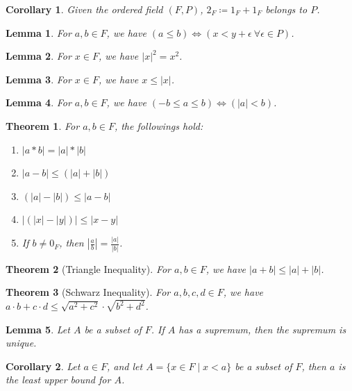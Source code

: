 \documentclass[11pt]{article}
\theoremstyle{break}
\theoremstyle{break}
\newtheorem{thm}{Theorem}[section]
\newtheorem{lem}{Lemma}[thm]
\newtheorem{corL}{Corollary}[lem]
\begin{document}
	\begin{corL}
		Given the ordered field $(F,P)$, $2_F \coloneqq 1_F + 1_F$ belongs to $P$.
	\end{corL}

	\begin{lem}
		For $a,b \in F$, we have $(a \leq b) \iff (x<y+\epsilon \ \forall \epsilon \in P)$.
	\end{lem}

	\begin{lem}
		For $x \in F$, we have $|x|^2 = x^2$.
	\end{lem}

	\begin{lem}
		For $x \in F$, we have $x \leq |x|$.
	\end{lem}
	
	\begin{lem}
		For $a,b \in F$, we have $(-b \leq a \leq b) \iff (|a| <b)$.
	\end{lem}

	\begin{thm}
		For $a,b \in F$, the followings hold:
		\begin{enumerate}[topsep=3pt,itemsep=-1ex,partopsep=1ex,parsep=1ex]
			\item $|a \ast b|=|a| \ast |b|$
			\item $|a-b| \leq (|a| + |b|)$
			\item $(|a|-|b|) \leq |a-b|$
			\item $|(|x|-|y|)| \leq |x-y|$
			\item If $b \neq 0_F$, then $\left|\frac{a}{b} \right|=\frac{|a|}{|b|}$.
		\end{enumerate}		 
	\end{thm}

	\begin{thm}[Triangle Inequality]
		For $a,b \in F$, we have $|a + b| \leq |a| + |b|$.	
	\end{thm}
	
	\begin{thm}[Schwarz Inequality]
		For $a,b,c,d \in F$, we have $a \cdot b + c \cdot d \leq \sqrt{a^2+c^2} \cdot \sqrt{b^2+d^2}$.
	\end{thm}
		
	
	\begin{lem}
		Let $A$ be a subset of $F$. If $A$ has a supremum, then the supremum is unique.
	\end{lem}
	
	\begin{corL}
		Let $a \in F$, and let $A=\{ x \in F \mid x < a \}$ be a subset of $F$, then $a$ is the least upper bound for $A$.
	\end{corL}
\end{document}
